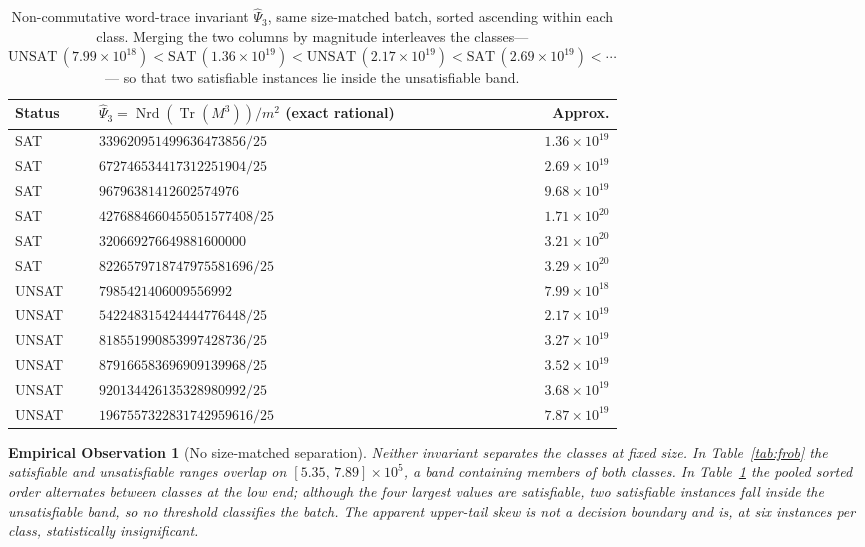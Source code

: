 \documentclass[pdflatex,sn-mathphys-num]{sn-jnl}
\theoremstyle{thmstyleone}%
\theoremstyle{thmstyletwo}%
\newtheorem{observation}[theorem]{Empirical Observation}%
\theoremstyle{thmstylethree}%
\newcommand{\Nrd}{\operatorname{Nrd}}
\newcommand{\Tr}{\operatorname{Tr}}
\begin{document}
\begin{table}[t]
\caption{Non-commutative word-trace invariant $\widehat{\Psi}_3$, same
size-matched batch, sorted ascending within each class. Merging the two
columns by magnitude interleaves the classes---
$\text{UNSAT}\,(7.99\times10^{18})<\text{SAT}\,(1.36\times10^{19})<
\text{UNSAT}\,(2.17\times10^{19})<\text{SAT}\,(2.69\times10^{19})<\cdots$---
so that two satisfiable instances lie inside the unsatisfiable band.}
\label{tab:trace}
\centering
\footnotesize
\begin{tabular}{@{}l l r@{}}
\toprule
Status & $\widehat{\Psi}_3=\Nrd(\Tr(M^{3}))/m^{2}$ (exact rational) & Approx.\\
\midrule
SAT   & $339620951499636473856/25$   & $1.36\times10^{19}$\\
SAT   & $672746534417312251904/25$   & $2.69\times10^{19}$\\
SAT   & $96796381412602574976$       & $9.68\times10^{19}$\\
SAT   & $4276884660455051577408/25$  & $1.71\times10^{20}$\\
SAT   & $320669276649881600000$      & $3.21\times10^{20}$\\
SAT   & $8226579718747975581696/25$  & $3.29\times10^{20}$\\
\midrule
UNSAT & $7985421406009556992$        & $7.99\times10^{18}$\\
UNSAT & $542248315424444776448/25$   & $2.17\times10^{19}$\\
UNSAT & $818551990853997428736/25$   & $3.27\times10^{19}$\\
UNSAT & $879166583696909139968/25$   & $3.52\times10^{19}$\\
UNSAT & $920134426135328980992/25$   & $3.68\times10^{19}$\\
UNSAT & $1967557322831742959616/25$  & $7.87\times10^{19}$\\
\bottomrule
\end{tabular}
\end{table}

\begin{observation}[No size-matched separation]\label{obs:interleave}
Neither invariant separates the classes at fixed size. In
Table~\ref{tab:frob} the satisfiable and unsatisfiable ranges overlap on
$[5.35,\,7.89]\times10^{5}$, a band containing members of both classes. In
Table~\ref{tab:trace} the pooled sorted order alternates between classes at
the low end; although the four largest values are satisfiable, two
satisfiable instances fall inside the unsatisfiable band, so no threshold
classifies the batch. The apparent upper-tail skew is not a decision
boundary and is, at six instances per class, statistically insignificant.
\end{observation}
\end{document}
